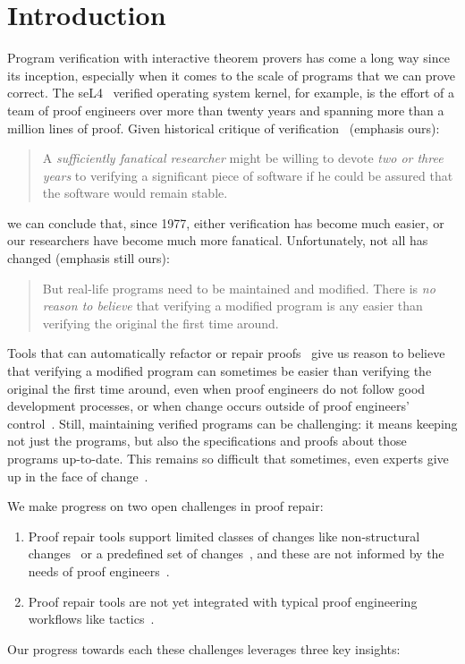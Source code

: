 \section{Introduction}

Program verification with interactive theorem provers has come a long way since its inception,
especially when it comes to the scale of programs that we can prove correct.
The seL4~\cite{Klein2009} verified operating system kernel, for example,
is the effort of a team of proof engineers over more than twenty years and spanning more than
a million lines of proof.
Given historical critique of verification~\cite{DeMillo1977} (emphasis ours):

\begin{quote}
A \textit{sufficiently fanatical researcher}
might be willing to devote \textit{two or 
three years} to verifying a significant 
piece of software if he could be 
assured that the software would remain stable.
\end{quote}
we can conclude that, since 1977, either verification has become much easier,
or our researchers have become much more fanatical. Unfortunately, not all has changed (emphasis still ours):

\begin{quote}
But real-life programs need to 
be maintained and modified. 
There is \textit{no reason to believe} that verifying a modified program is any 
easier than verifying the original the 
first time around.
\end{quote}
Tools that can automatically refactor or repair proofs~\cite{wibergh2019, WhitesidePhD, Dietrich2013, adams2015, Bourke12, Roe2016, robert2018, pumpkinpatch}
give us reason to believe that verifying a modified program can sometimes be easier than verifying the original the first time
around, even when proof engineers do not follow good development processes,
or when change occurs outside of proof engineers' control~\cite{PGL-045}.
Still, maintaining verified programs can be challenging: it means keeping not just the programs, but also the
specifications and proofs about those programs up-to-date.
This remains so difficult that sometimes, even experts give up in the face of change~\cite{replica}.

We make progress on two open challenges in proof repair:

\begin{enumerate}
\item Proof repair tools support limited classes of changes like non-structural changes~\cite{pumpkinpatch} or a predefined set
of changes~\cite{robert2018, wibergh2019}, and these are not informed by the needs of proof engineers~\cite{replica}.
\item Proof repair tools are not yet integrated with typical proof engineering workflows like tactics~\cite{PGL-045, pumpkinpatch, robert2018}.
\end{enumerate}
Our progress towards each these challenges leverages three key insights: %

